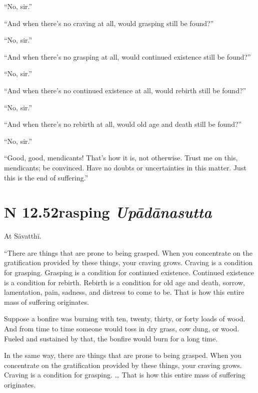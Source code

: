 \documentclass[12pt,openany]{book}%
\newcommand*{\suttatitleacronym}[1]{\smaller[2]{#1}\vspace*{.3em}}
\newcommand*{\suttatitletranslation}[1]{\linebreak{#1}}
\newcommand*{\suttatitleroot}[1]{\linebreak\smaller[2]\itshape{#1}}
\newcommand*{\tocacronym}[1]{\hspace*{-3.3em}{#1}\quad}
\newcommand*{\toctranslation}[1]{#1}
\newcommand*{\tocroot}[1]{(\textit{#1})}
\begin{document}
“No, sir.” 

“And when there’s no craving at all, would grasping still be found?” 

“No, sir.” 

“And when there’s no grasping at all, would continued existence still be found?” 

“No, sir.” 

“And when there’s no continued existence at all, would rebirth still be found?” 

“No, sir.” 

“And when there’s no rebirth at all, would old age and death still be found?” 

“No, sir.” 

“Good, good, mendicants! That’s how it is, not otherwise. Trust me on this, mendicants; be convinced. Have no doubts or uncertainties in this matter. Just this is the end of suffering.” 

%
\section*{{\suttatitleacronym SN 12.52}{\suttatitletranslation Grasping }{\suttatitleroot Upādānasutta}}
\addcontentsline{toc}{section}{\tocacronym{SN 12.52} \toctranslation{Grasping } \tocroot{Upādānasutta}}

At \textsanskrit{Sāvatthī}. 

“There are things that are prone to being grasped. When you concentrate on the gratification provided by these things, your craving grows. Craving is a condition for grasping. Grasping is a condition for continued existence. Continued existence is a condition for rebirth. Rebirth is a condition for old age and death, sorrow, lamentation, pain, sadness, and distress to come to be. That is how this entire mass of suffering originates. 

Suppose a bonfire was burning with ten, twenty, thirty, or forty loads of wood. And from time to time someone would toss in dry grass, cow dung, or wood. Fueled and sustained by that, the bonfire would burn for a long time. 

In the same way, there are things that are prone to being grasped. When you concentrate on the gratification provided by these things, your craving grows. Craving is a condition for grasping. … That is how this entire mass of suffering originates. 
\end{document}
